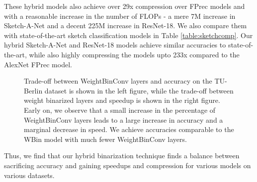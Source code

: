 \documentclass[10pt,twocolumn,letterpaper]{article}
\begin{document}
These hybrid models also achieve over 29x compression over FPrec models and with a reasonable increase in the number of FLOPs - a mere 7M increase in Sketch-A-Net and a decent 225M increase in ResNet-18. We also compare them with state-of-the-art sketch classification models in Table \ref{table:sketchcomp}. Our hybrid Sketch-A-Net and ResNet-18 models achieve similar accuracies to state-of-the-art, while also highly compressing the models upto 233x compared to the AlexNet FPrec model. 
\begin{figure*}
\vspace*{-0.75cm}
\begin{center}
\end{center}
\vspace*{-0.5cm}
\caption{Trade-off between WeightBinConv layers and accuracy on the TU-Berlin dataset is shown in the left figure, while the trade-off between weight binarized layers and speedup is shown in the right figure. Early on, we observe that a small increase in the percentage of WeightBinConv layers leads to a large increase in accuracy and a marginal decrease in speed. We achieve accuracies comparable to the WBin model with much fewer WeightBinConv layers.
}
\label{fig:tradeoff}
\vspace*{-0.3cm}
\end{figure*}
Thus, we find that our hybrid binarization technique finds a balance between sacrificing accuracy and gaining speedups and compression for various models on various datasets.
\end{document}
